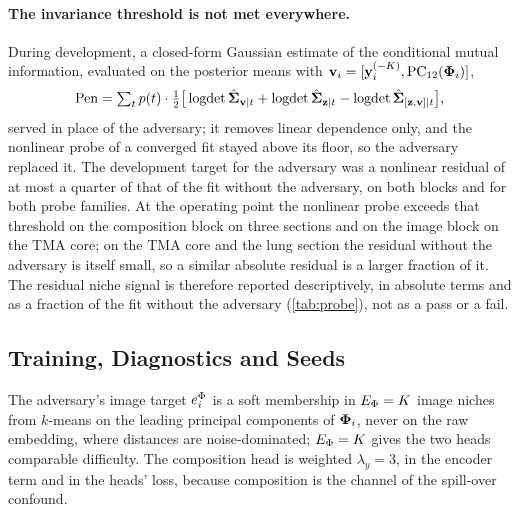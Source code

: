 \paragraph{The invariance threshold is not met everywhere.} During development, a closed-form Gaussian estimate of the conditional mutual information, evaluated on the posterior means with $\mathbf{v}_i = [\mathbf{y}_i^{(-K)}, \mathrm{PC}_{12}(\boldsymbol{\Phi}_i)]$,
\begin{equation}
  \mathrm{Pen} = \textstyle\sum_t p(t)\cdot \tfrac{1}{2}\big[\operatorname{logdet} \hat{\boldsymbol{\Sigma}}_{\mathbf{v} \mid t} + \operatorname{logdet} \hat{\boldsymbol{\Sigma}}_{\mathbf{z} \mid t} - \operatorname{logdet} \hat{\boldsymbol{\Sigma}}_{[\mathbf{z},\mathbf{v}] \mid t}\big],
  \label{eq:S-penalty}
\end{equation}
served in place of the adversary; it removes linear dependence only, and the nonlinear probe of a converged fit stayed above its floor, so the adversary replaced it. The development target for the adversary was a nonlinear residual of at most a quarter of that of the fit without the adversary, on both blocks and for both probe families. At the operating point the nonlinear probe exceeds that threshold on the composition block on three sections and on the image block on the TMA core; on the TMA core and the lung section the residual without the adversary is itself small, so a similar absolute residual is a larger fraction of it. The residual niche signal is therefore reported descriptively, in absolute terms and as a fraction of the fit without the adversary (\cref{tab:probe}), not as a pass or a fail.

\subsection{Training, Diagnostics and Seeds}

The adversary's image target $e^{\Phi}_i$ is a soft membership in $E_{\Phi} = K$ image niches from $k$-means on the leading principal components of $\boldsymbol{\Phi}_i$, never on the raw embedding, where distances are noise-dominated; $E_{\Phi} = K$ gives the two heads comparable difficulty. The composition head is weighted $\lambda_y = 3$, in the encoder term and in the heads' loss, because composition is the channel of the spill-over confound.

